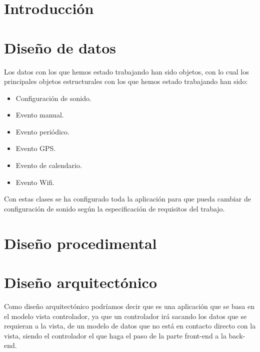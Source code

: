 
\section{Introducción}

\section{Diseño de datos}
Los datos con los que hemos estado trabajando han sido objetos, con lo cual los principales objetos estructurales con los que hemos estado trabajando han sido:
\begin{itemize}
	\item Configuración de sonido.
	\item Evento manual.
	\item Evento periódico.
	\item Evento GPS.
	\item Evento de calendario.
	\item Evento Wifi.
\end{itemize}

Con estas clases se ha configurado toda la aplicación para que pueda cambiar de configuración de sonido según la especificación de requisitos del trabajo.



\section{Diseño procedimental}

\section{Diseño arquitectónico}

Como diseño arquitectónico podríamos decir que es una aplicación que se basa en el modelo vista controlador, ya que un controlador irá sacando los datos que se requieran a la vista, de un modelo de datos que no está en contacto directo con la vista, siendo el controlador el que haga el paso de la parte front-end a la back-end.


